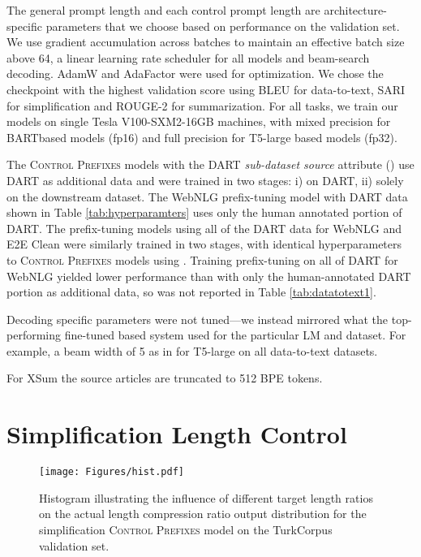 \documentclass[11pt]{article}
\newcommand{\control}{\textsc{Control Prefixes}\xspace}
\newcommand{\bartl}{BART}
\begin{document}
The general prompt length and each control prompt length are
architecture-specific parameters that we choose based on performance on the validation
set.  We use gradient accumulation across batches to maintain an effective batch size above 64, a linear learning rate scheduler for all models and beam-search decoding. AdamW \citep{adamw}
and AdaFactor \citep{adafactor} were used for optimization. We chose the checkpoint with the highest validation score using BLEU for data-to-text, SARI for simplification and ROUGE-2 for summarization. For all tasks, we train our models on single Tesla V100-SXM2-16GB machines, with mixed precision for \bartl based models (fp16) and full precision for T5-large based models (fp32).

The \control models with the DART \emph{sub-dataset source} attribute () use DART as additional data and were trained in two stages: i) on DART, ii) solely on the downstream dataset. The WebNLG prefix-tuning model with DART data shown in Table \ref{tab:hyperparamters} uses only the human annotated portion of DART. The prefix-tuning models using all of the DART data for WebNLG and E2E Clean were similarly trained in two stages, with identical hyperparameters to \control models using . Training prefix-tuning on all of DART for WebNLG yielded lower performance than with only the human-annotated DART portion as additional data, so was not reported in Table \ref{tab:datatotext1}.

Decoding specific parameters were not tuned—we instead mirrored what the top-performing fine-tuned based system used for the particular LM and dataset. For example, a beam width of 5 as in \citet{ribeiro} for T5-large on all data-to-text datasets. 

For XSum the source articles are truncated to 512 BPE tokens.





\section{Simplification Length Control}
\label{app:length_control}
\begin{figure}[h]
\centering
    \texttt{[image: Figures/hist.pdf]}
        \caption{\small{Histogram illustrating the influence of different target length ratios on the actual length compression ratio output distribution for the simplification \control model on the TurkCorpus validation set.}}
\label{fig:app_hist}
\end{figure}
\end{document}
